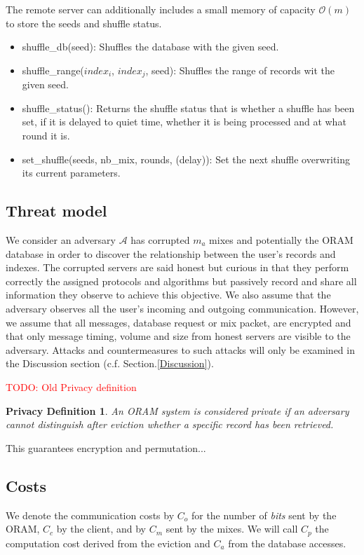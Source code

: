 \documentclass[english,oneside,twocolumn]{article}
\newtheorem{privdef}{Privacy Definition}
\newcommand{\todo}[1]{\textcolor{red}{TODO: #1}}
\begin{document}
The remote server can additionally includes a small memory of capacity $\mathcal{O}(m)$ to store the seeds and shuffle status.
\begin{itemize}
 \item shuffle\_db(seed): Shuffles the database with the given seed.
 \item shuffle\_range($index_i$, $index_j$, seed): Shuffles the range of records wit the given seed.
 \item shuffle\_status(): Returns the shuffle status that is whether a shuffle has been set, if it is delayed to quiet time, whether it is being processed and at what round it is.
 \item set\_shuffle(seeds, nb\_mix, rounds, (delay)): Set the next shuffle overwriting its current parameters.
\end{itemize}


\subsection{Threat model}
We consider an adversary $\mathcal{A}$ has corrupted $m_{a}$ mixes and potentially the ORAM database in order to discover the relationship between the user's records and indexes.
The corrupted servers are said honest but curious in that they perform correctly the assigned protocols and algorithms but passively record and share all information they observe to achieve this objective.
We also assume that the adversary observes all the user's incoming and outgoing communication. However, we assume that all messages, database request or mix packet, are encrypted and that only message timing, volume and size from honest servers are visible to the adversary.
Attacks and countermeasures to such attacks will only be examined in the Discussion section (c.f. Section.\ref{Discussion}).

\todo{Old Privacy definition}

\begin{privdef}
An ORAM system is considered private if an adversary cannot distinguish after eviction whether a specific record has been retrieved. 
\end{privdef}

This guarantees encryption and permutation...

\subsection{Costs}
We denote the communication costs by $C_o$ for the number of \emph{bits} sent by the ORAM, $C_{c}$ by the client, and by $C_{m}$ sent by the mixes. 
We will call $C_p$ the computation cost derived from the eviction and $C_a$ from the database accesses.
\end{document}
